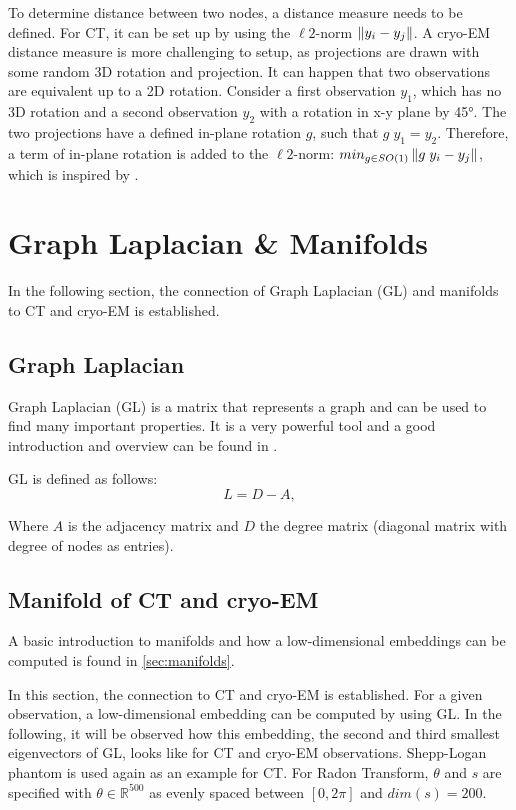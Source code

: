 To determine distance between two nodes, a distance measure needs to be defined.
For CT, it can be set up by using the $\ell2$-norm $\left\lVert y_i - y_j\right\rVert$.
A cryo-EM distance measure is more challenging to setup, as projections are drawn with some random 3D rotation and projection.
It can happen that two observations are equivalent up to a 2D rotation. 
Consider a first observation $y_1$, which has no 3D rotation and 
a second observation $y_2$ with a rotation in x-y plane by 45°.
The two projections have a defined in-plane rotation $g$, such that $g \; y_1 = y_2$.
Therefore, a term of in-plane rotation is added to the $\ell2$-norm: $min_{g \in SO(1)}\left\lVert g \;y_i - y_j\right\rVert$, 
which is inspired by \cite{multiDiffusionMaps}.



\section{Graph Laplacian \& Manifolds}
In the following section, the connection of Graph Laplacian (GL) and manifolds to CT and cryo-EM is established.

\subsection{Graph Laplacian}
Graph Laplacian (GL) is a matrix that represents a graph and can be used to find many important properties.
It is a very powerful tool and a good introduction and overview can be found in \cite{tutorialSpectralClustering, SpectralGraphTheory}. 

GL is defined as follows:
\begin{equation}
    \label{eq:gl}
    L = D - A,
\end{equation}

Where $A$ is the adjacency matrix and $D$ the degree matrix (diagonal matrix with degree of nodes as entries).


\subsection{Manifold of CT and cryo-EM}
A basic introduction to manifolds and how a low-dimensional embeddings can be computed is found in \ref{sec:manifolds}.

In this section, the connection to CT and cryo-EM is established.
For a given observation, a low-dimensional embedding can be computed by using GL.
In the following, it will be observed how this embedding, the second and third smallest eigenvectors of GL, looks like for CT and cryo-EM observations.
Shepp-Logan phantom is used again as an example for CT.
For Radon Transform, $\theta$ and $s$ are specified with $\theta \in \mathbb{R}^{500}$ as evenly spaced
between $[0, 2 \pi]$ and $dim(s) = 200$. 


